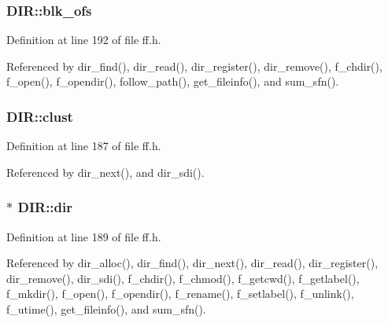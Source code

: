 \subsubsection[{\texorpdfstring{blk\+\_\+ofs}{blk_ofs}}]{ D\+I\+R\+::blk\+\_\+ofs}\hypertarget{structDIR_afdb5d6302a88eaf5d43da0352ca2cc91}{}\label{structDIR_afdb5d6302a88eaf5d43da0352ca2cc91}


Definition at line 192 of file ff.\+h.



Referenced by dir\+\_\+find(), dir\+\_\+read(), dir\+\_\+register(), dir\+\_\+remove(), f\+\_\+chdir(), f\+\_\+open(), f\+\_\+opendir(), follow\+\_\+path(), get\+\_\+fileinfo(), and sum\+\_\+sfn().

\subsubsection[{\texorpdfstring{clust}{clust}}]{ D\+I\+R\+::clust}\hypertarget{structDIR_acfbb8ba2d6e73b6f999ceffd1857c190}{}\label{structDIR_acfbb8ba2d6e73b6f999ceffd1857c190}


Definition at line 187 of file ff.\+h.



Referenced by dir\+\_\+next(), and dir\+\_\+sdi().

\subsubsection[{\texorpdfstring{dir}{dir}}]{$\ast$ D\+I\+R\+::dir}\hypertarget{structDIR_a6c2a8c0cf2d55ae99775e93a16593449}{}\label{structDIR_a6c2a8c0cf2d55ae99775e93a16593449}


Definition at line 189 of file ff.\+h.



Referenced by dir\+\_\+alloc(), dir\+\_\+find(), dir\+\_\+next(), dir\+\_\+read(), dir\+\_\+register(), dir\+\_\+remove(), dir\+\_\+sdi(), f\+\_\+chdir(), f\+\_\+chmod(), f\+\_\+getcwd(), f\+\_\+getlabel(), f\+\_\+mkdir(), f\+\_\+open(), f\+\_\+opendir(), f\+\_\+rename(), f\+\_\+setlabel(), f\+\_\+unlink(), f\+\_\+utime(), get\+\_\+fileinfo(), and sum\+\_\+sfn().

